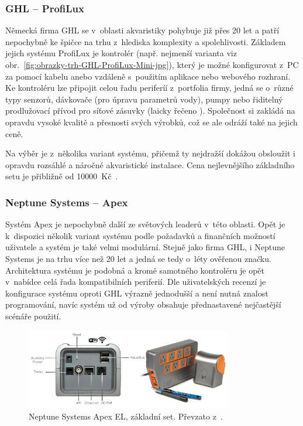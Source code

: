         \subsubsection{GHL -- ProfiLux}
            Německá firma GHL se v~oblasti akvaristiky pohybuje již přes 20 let a patří nepochybně ke špičce na trhu z~hlediska komplexity a spolehlivosti. Základem jejich systému ProfiLux je kontrolér (např. nejmenší varianta viz obr.~\ref{fig:obrazky-trh-GHL-ProfiLux-Mini-jpg}), který je možné konfigurovat z~PC za pomocí kabelu anebo vzdáleně s~použitím aplikace nebo webového rozhraní. Ke kontroléru lze připojit celou řadu periferíí z~portfolia firmy, jedná se o~různé typy senzorů, dávkovače (pro úpravu parametrů vody), pumpy nebo řiditelný prodlužovací přívod pro síťové zásuvky (laicky řečeno ). Společnost si zakládá na opravdu vysoké kvalitě a přesnosti svých výrobků, což se ale odráží také na jejich ceně. 

            Na výběr je z~několika variant systému, přičemž ty nejdražší dokážou obsloužit i opravdu rozsáhlé a náročné akvaristické instalace. Cena nejlevnějšího základního setu je přibližně od \qty{10000}{Kč}~\cite{ghl-profilux,eshop-ghl-profilux-sets}.

            
        \subsubsection{Neptune Systems -- Apex}
            Systém Apex je nepochybně další ze světových leaderů v~této oblasti. Opět je k~dispozici několik variant systému podle požadavků a finančních možností uživatele a systém je také velmi modulární. Stejně jako firma GHL, i Neptune Systems je na trhu více než 20 let a jedná se tedy o~léty ověřenou značku. Architektura systému je podobná a kromě samotného kontroléru je opět v~nabídce celá řada kompatibilních periferií. Dle uživatelských recenzí je konfigurace systému oproti GHL výrazně jednodušší a není nutná znalost programování, navíc systém už od výroby obsahuje přednastavené nejčastější scénáře použití.

            \begin{figure}[h!]
                \centering
                \includegraphics[width=0.8\textwidth]{obrazky/trh/apex-el.jpg}
                \caption{Neptune Systems Apex EL, základní set. Převzato z~\cite{eshop-neptune-systems-apex}.}
                \label{fig:obrazky-trh-apex-el}
            \end{figure}
            
